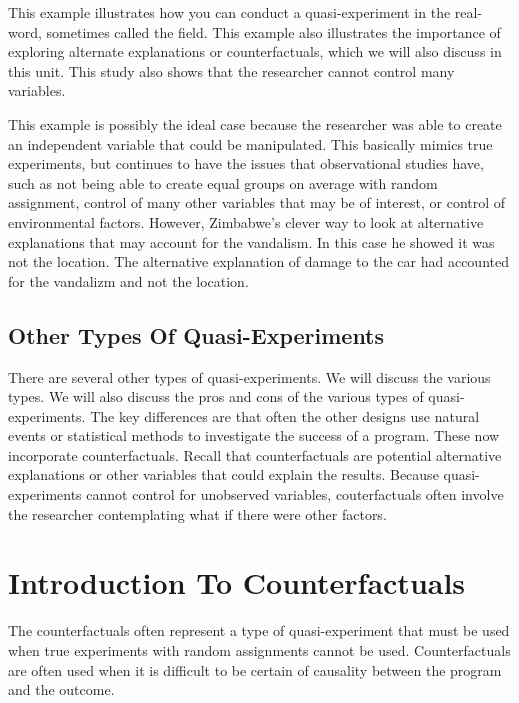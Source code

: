 \documentclass[]{book}
\theoremstyle{definition}
\theoremstyle{definition}
\theoremstyle{definition}
\theoremstyle{remark}
\begin{document}
This example illustrates how you can conduct a quasi-experiment in the
real-word, sometimes called the field. This example also illustrates the
importance of exploring alternate explanations or counterfactuals, which
we will also discuss in this unit. This study also shows that the
researcher cannot control many variables.

This example is possibly the ideal case because the researcher was able
to create an independent variable that could be manipulated. This
basically mimics true experiments, but continues to have the issues that
observational studies have, such as not being able to create equal
groups on average with random assignment, control of many other
variables that may be of interest, or control of environmental factors.
However, Zimbabwe's clever way to look at alternative explanations that
may account for the vandalism. In this case he showed it was not the
location. The alternative explanation of damage to the car had accounted
for the vandalizm and not the location.

\hypertarget{other-types-of-quasi-experiments}{%
\subsection{Other Types Of
Quasi-Experiments}\label{other-types-of-quasi-experiments}}

There are several other types of quasi-experiments. We will discuss the
various types. We will also discuss the pros and cons of the various
types of quasi-experiments. The key differences are that often the other
designs use natural events or statistical methods to investigate the
success of a program. These now incorporate counterfactuals. Recall that
counterfactuals are potential alternative explanations or other
variables that could explain the results. Because quasi-experiments
cannot control for unobserved variables, couterfactuals often involve
the researcher contemplating what if there were other factors.

\hypertarget{introduction-to-counterfactuals}{%
\section{Introduction To
Counterfactuals}\label{introduction-to-counterfactuals}}

The counterfactuals often represent a type of quasi-experiment that must
be used when true experiments with random assignments cannot be used.
Counterfactuals are often used when it is difficult to be certain of
causality between the program and the outcome.
\end{document}
